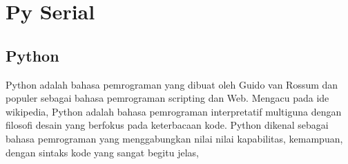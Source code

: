 \section{Py Serial}

	\subsection{Python}
	Python adalah bahasa pemrograman yang dibuat oleh Guido van Rossum dan populer sebagai bahasa pemrograman scripting dan Web. Mengacu pada ide wikipedia, 
	Python adalah bahasa pemrograman interpretatif multiguna dengan filosofi desain yang berfokus pada keterbacaan kode. Python dikenal sebagai bahasa pemrograman 
	yang menggabungkan nilai nilai kapabilitas, kemampuan, dengan sintaks kode yang sangat begitu jelas, 